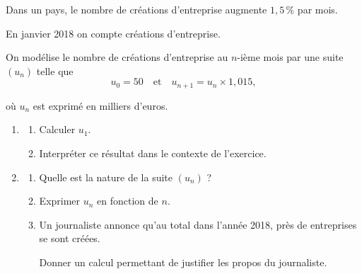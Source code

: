 \medskip

Dans un pays, le nombre de créations d'entreprise augmente $1,5\,\%$ par mois.

En janvier 2018 on compte  créations d'entreprise.

On modélise le nombre de créations d'entreprise au $n$-ième mois par une suite $\left(u_n\right)$ telle que \[u_0 = 50 \quad \text{et} \quad u_{n+1} = u_n \times 1,015,\]

où $u_n$ est exprimé en milliers d'euros.

\medskip

\begin{enumerate}
\item 
	\begin{enumerate}
		\item Calculer $u_1$.
		\item Interpréter ce résultat dans le contexte de l'exercice.
	\end{enumerate}
\item	
	\begin{enumerate}
		\item Quelle est la nature de la suite $\left(u_n\right)$ ?

		\item Exprimer $u_n$ en fonction de $n$.
		\item Un journaliste annonce qu'au total dans l'année 2018, près de  entreprises se sont
créées.

Donner un calcul permettant de justifier les propos du journaliste.
	\end{enumerate}
\end{enumerate}

\medskip

